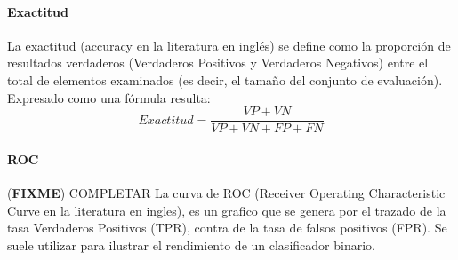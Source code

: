\documentclass[a4paper,11pt,spanish]{book}
\newcommand*{\FIXME}[1]{{(\textbf{FIXME}) {#1}}}
\begin{document}
	  \paragraph { Exactitud }
	    La exactitud (accuracy en la literatura en inglés) se define como la proporción de resultados verdaderos (Verdaderos Positivos y Verdaderos Negativos) entre el total 
	    de elementos examinados (es decir, el tamaño del conjunto de evaluación). Expresado como una fórmula resulta:\\
	    \begin{equation}
	      Exactitud = {\frac {VP+VN}{VP+VN+FP+FN}}
	    \end{equation}

	  \paragraph {ROC}
	    \FIXME{COMPLETAR}
	    La curva de ROC (Receiver Operating Characteristic Curve en la literatura en ingles), es un grafico que se genera por el trazado de la tasa Verdaderos Positivos (TPR),
	    contra de la tasa de falsos positivos (FPR). Se suele utilizar para ilustrar el rendimiento de un clasificador binario.
\end{document}
